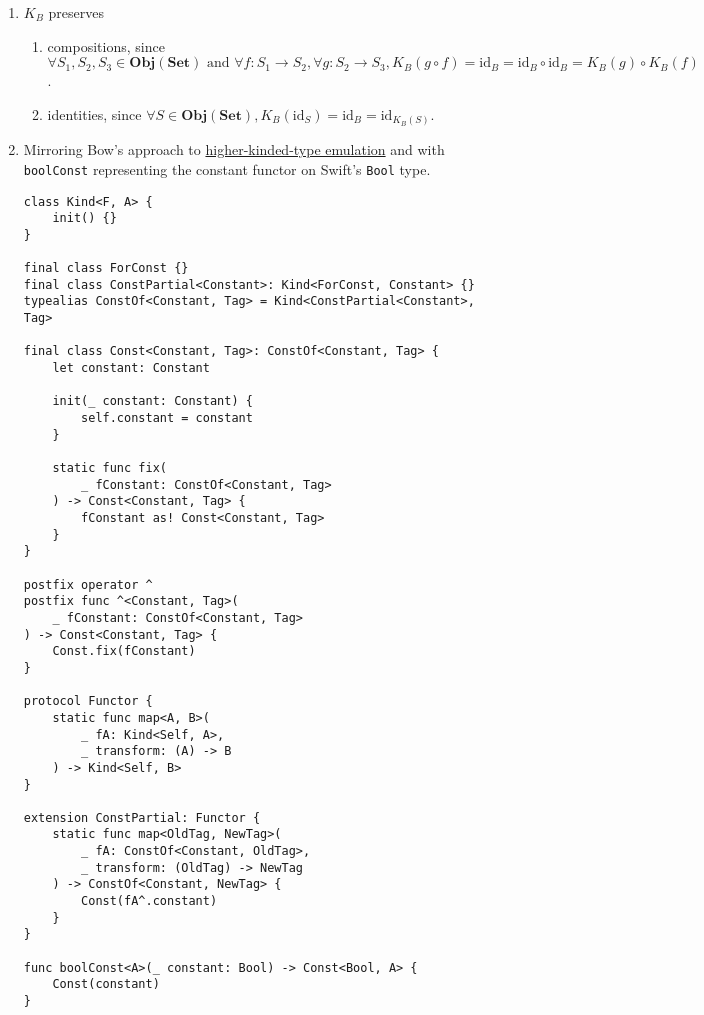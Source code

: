 \documentclass{article}
\begin{document}
\begin{enumerate}[label=(\alph*)]

\item $K_B$ preserves

\begin{enumerate}[label=-]
        \item compositions, since $\forall S_1, S_2, S_3 \in \textbf{Obj}(\textbf{Set}) \textrm{ and } \forall f: S_1 \rightarrow S_2, \forall g: S_2 \rightarrow S_3, K_B(g \circ f) = \textrm{id}_B = \textrm{id}_B \circ \textrm{id}_B = K_B(g) \circ K_B(f)$.
        \item identities, since $\forall S \in \textbf{Obj}(\textbf{Set}), K_B(\textrm{id}_S) = \textrm{id}_B = \textrm{id}_{K_B(S)}$.
    \end{enumerate}

\item Mirroring Bow’s approach to \href{https://bow-swift.io/docs/fp-concepts/higher-kinded-types/}{higher-kinded-type emulation} and with \texttt{boolConst} representing the constant functor on Swift’s \texttt{Bool} type.

\begin{verbatim}
class Kind<F, A> {
	init() {}
}

final class ForConst {}
final class ConstPartial<Constant>: Kind<ForConst, Constant> {}
typealias ConstOf<Constant, Tag> = Kind<ConstPartial<Constant>, Tag>

final class Const<Constant, Tag>: ConstOf<Constant, Tag> {
	let constant: Constant

	init(_ constant: Constant) {
		self.constant = constant
	}

	static func fix(
		_ fConstant: ConstOf<Constant, Tag>
	) -> Const<Constant, Tag> {
		fConstant as! Const<Constant, Tag>
	}
}

postfix operator ^
postfix func ^<Constant, Tag>(
	_ fConstant: ConstOf<Constant, Tag>
) -> Const<Constant, Tag> {
	Const.fix(fConstant)
}

protocol Functor {
	static func map<A, B>(
		_ fA: Kind<Self, A>,
		_ transform: (A) -> B
	) -> Kind<Self, B>
}

extension ConstPartial: Functor {
	static func map<OldTag, NewTag>(
		_ fA: ConstOf<Constant, OldTag>,
		_ transform: (OldTag) -> NewTag
	) -> ConstOf<Constant, NewTag> {
		Const(fA^.constant)
	}
}

func boolConst<A>(_ constant: Bool) -> Const<Bool, A> {
	Const(constant)
}
\end{verbatim}

\end{enumerate}
\end{document}
